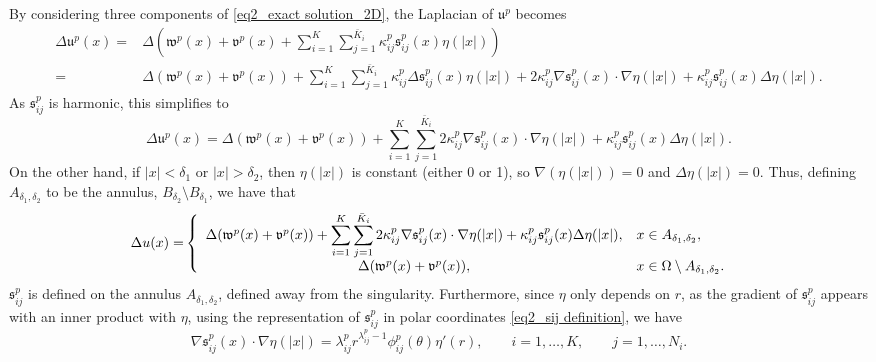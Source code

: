 \documentclass[oneside]{article}
\begin{document}
\noindent By considering three components of \eqref{eq2_exact solution_2D}, the Laplacian of $\mathfrak{u}^p$ becomes
\begin{equation}
\begin{split}
\Delta \mathfrak{u}^p(x)=&\Delta (\mathfrak{w}^p(x) + \mathfrak{v}^p(x) + \sum_{i = 1}^K\sum_{j = 1}^{\bar{K}_i}\kappa^p_{ij} \mathfrak{s}_{ij}^p(x)\eta(|x|))\\
=& \Delta (\mathfrak{w}^p(x)  + \mathfrak{v}^p(x)) +\sum_{i = 1}^K\sum_{j = 1}^{\bar{K}_i}\kappa^p_{ij} \Delta \mathfrak{s}_{ij}^p(x)\eta(|x|)+2\kappa^p_{ij} \nabla \mathfrak{s}_{ij}^p(x)\cdot\nabla \eta(|x|)+\kappa^p_{ij} \mathfrak{s}_{ij}^p(x)\Delta \eta(|x|).
\end{split}
\end{equation}
As $\mathfrak{s}_{ij}^p$ is harmonic, this simplifies to 
\begin{equation}
    \Delta \mathfrak{u}^p(x)=\Delta (\mathfrak{w}^p(x) + \mathfrak{v}^p(x)) + \sum_{i = 1}^K\sum_{j = 1}^{\bar{K}_i}2\kappa^p_{ij} \nabla \mathfrak{s}^p_{ij}(x)\cdot\nabla \eta(|x|)+\kappa^p_{ij} \mathfrak{s}^p_{ij}(x)\Delta \eta(|x|).
\end{equation}
On the other hand, if $|x|<\delta_1$ or $|x|>\delta_2$, then $\eta(|x|)$ is constant (either 0 or 1), so $\nabla(\eta(|x|))=0$ and $\Delta \eta(|x|)=0$. Thus, defining $A_{\delta_1,\delta_2}$ to be the annulus, $B_{\delta_2}\setminus B_{\delta_1}$, we have that 
\begin{equation}\label{eq2_Delta_u}
\begin{split}
\Delta u(x)=&\left\{\begin{array}{c l} 
\Delta (\mathfrak{w}^p(x) + \mathfrak{v}^p(x))+\displaystyle  \sum_{i = 1}^K\sum_{j = 1}^{\bar{K}_i}2\kappa^p_{ij} \nabla \mathfrak{s}^p_{ij}(x)\cdot\nabla \eta(|x|)+\kappa^p_{ij} \mathfrak{s}^p_{ij}(x)\Delta \eta(|x|), & x\in A_{\delta_1,\delta_2},\\
\Delta  (\mathfrak{w}^p(x) + \mathfrak{v}^p(x)),&x\in \Omega\setminus A_{\delta_1,\delta_2}. \end{array}\right.
\end{split}
\end{equation}
 $\mathfrak{s}^p_{ij}$ is defined on the annulus $A_{\delta_1,\delta_2}$, defined away from the singularity. Furthermore, since $\eta$ only depends on $r$, as the gradient of $\mathfrak{s}_{ij}^p$ appears with an inner product with $\eta$, using the representation of $\mathfrak{s}_{ij}^p$ in polar coordinates \eqref{eq2_sij definition}, we have 
 \begin{equation}
     \nabla \mathfrak{s}^p_{ij}(x)\cdot\nabla \eta(|x|) = \lambda^p_{ij} r^{\lambda_{ij}^p-1}\phi^p_{ij}(\theta)\eta'(r), \qquad i=1, \ldots, K, \qquad j=1, \ldots, N_i.
 \end{equation}
\end{document}
